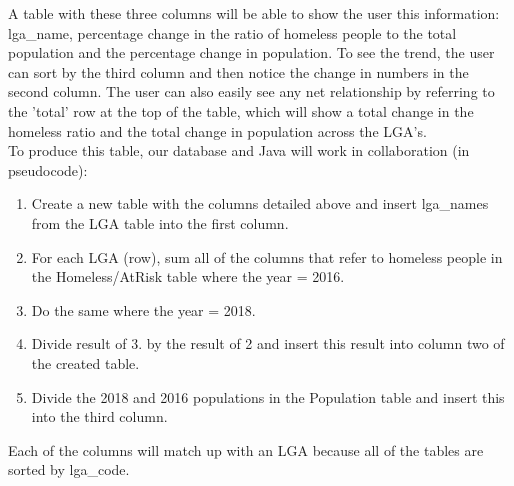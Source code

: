 \documentclass[12pt, a4paper]{article}
\begin{document}
A table with these three columns will be able to show the user this information: lga\_name, percentage change in the ratio of homeless people to the total population and the percentage change in population. To see the trend, the user can sort by the third column and then notice the change in numbers in the second column. The user can also easily see any net relationship by referring to the 'total' row at the top of the table, which will show a total change in the homeless ratio and the total change in population across the LGA's. \\
To produce this table, our database and Java will work in collaboration (in pseudocode):
\begin{enumerate}
\item Create a new table with the columns detailed above and insert lga\_names from the LGA table into the first column.
\item For each LGA (row), sum all of the columns that refer to homeless people in the Homeless/AtRisk table where the year = 2016.
\item Do the same where the year = 2018.
\item Divide result of 3. by the result of 2 and insert this result into column two of the created table.
\item Divide the 2018 and 2016 populations in the Population table and insert this into the third column.
\end{enumerate}
Each of the columns will match up with an LGA because all of the tables are sorted by lga\_code.
\end{document}
